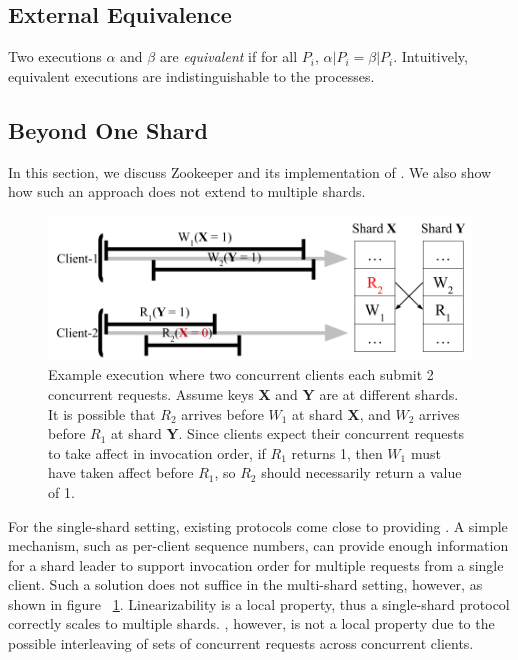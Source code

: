 \subsection{External Equivalence}
\label{sec:mdl:equivalence}

 Two executions $\alpha$ and $\beta$ are
\textit{equivalent} if for all $P_i$, $\alpha|P_i = \beta|P_i$. Intuitively,
equivalent executions are indistinguishable to the processes.

\subsection{\MDL{} Beyond One Shard}
\label{sec:mdl:zookeeper}

In this section, we discuss Zookeeper and its implementation of \SDL{}.
We also show how such an approach does not extend to multiple shards.

\begin{figure}[!htb]
    \includegraphics[scale=.45]{somet.png}
    \caption{Example execution where two concurrent clients each submit 2 concurrent requests. Assume keys \textbf{X} and \textbf{Y} are at different shards. It is possible that $R_2$ arrives before $W_1$ at shard \textbf{X}, and $W_2$ arrives before $R_1$ at shard \textbf{Y}. Since clients expect their concurrent requests to take affect in invocation order, if $R_1$ returns 1, then $W_1$ must have taken affect before $R_1$, so $R_2$ should necessarily return a value of 1.}
    \label{fig:concurrentbatches}
\end{figure}

For the single-shard setting, existing protocols come close to providing \MDL{}. A simple mechanism, such as per-client sequence numbers, can provide enough information for a shard leader to support invocation order for multiple requests from a single client. Such a solution does not suffice in the multi-shard setting, however, as shown in figure ~\ref{fig:concurrentbatches}. Linearizability is a local property, thus a single-shard protocol correctly scales to multiple shards. \MDL{}, however, is not a local property due to the possible interleaving of sets of concurrent requests across concurrent clients.

